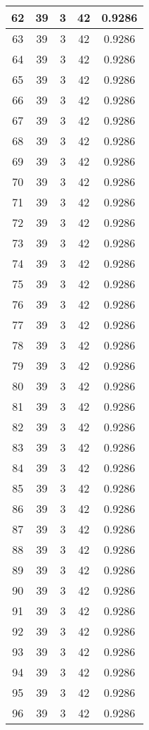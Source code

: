 \documentclass[letterpaper, 12pt]{article}
\begin{document}
\begin{longtable}{|c|c|c|c|c|}
\hline
62 & 39 & 3 & 42 & 0.9286 \\
\hline
63 & 39 & 3 & 42 & 0.9286 \\
\hline
64 & 39 & 3 & 42 & 0.9286 \\
\hline
65 & 39 & 3 & 42 & 0.9286 \\
\hline
66 & 39 & 3 & 42 & 0.9286 \\
\hline
67 & 39 & 3 & 42 & 0.9286 \\
\hline
68 & 39 & 3 & 42 & 0.9286 \\
\hline
69 & 39 & 3 & 42 & 0.9286 \\
\hline
70 & 39 & 3 & 42 & 0.9286 \\
\hline
71 & 39 & 3 & 42 & 0.9286 \\
\hline
72 & 39 & 3 & 42 & 0.9286 \\
\hline
73 & 39 & 3 & 42 & 0.9286 \\
\hline
74 & 39 & 3 & 42 & 0.9286 \\
\hline
75 & 39 & 3 & 42 & 0.9286 \\
\hline
76 & 39 & 3 & 42 & 0.9286 \\
\hline
77 & 39 & 3 & 42 & 0.9286 \\
\hline
78 & 39 & 3 & 42 & 0.9286 \\
\hline
79 & 39 & 3 & 42 & 0.9286 \\
\hline
80 & 39 & 3 & 42 & 0.9286 \\
\hline
81 & 39 & 3 & 42 & 0.9286 \\
\hline
82 & 39 & 3 & 42 & 0.9286 \\
\hline
83 & 39 & 3 & 42 & 0.9286 \\
\hline
84 & 39 & 3 & 42 & 0.9286 \\
\hline
85 & 39 & 3 & 42 & 0.9286 \\
\hline
86 & 39 & 3 & 42 & 0.9286 \\
\hline
87 & 39 & 3 & 42 & 0.9286 \\
\hline
88 & 39 & 3 & 42 & 0.9286 \\
\hline
89 & 39 & 3 & 42 & 0.9286 \\
\hline
90 & 39 & 3 & 42 & 0.9286 \\
\hline
91 & 39 & 3 & 42 & 0.9286 \\
\hline
92 & 39 & 3 & 42 & 0.9286 \\
\hline
93 & 39 & 3 & 42 & 0.9286 \\
\hline
94 & 39 & 3 & 42 & 0.9286 \\
\hline
95 & 39 & 3 & 42 & 0.9286 \\
\hline
96 & 39 & 3 & 42 & 0.9286 \\

\end{longtable}
\end{document}
